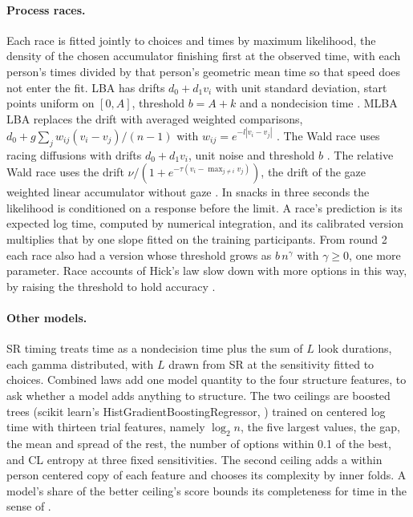 \documentclass[11pt]{article}
\begin{document}
\paragraph{Process races.} Each race is fitted jointly to choices and times by maximum likelihood, the density of the chosen accumulator finishing first at the observed time, with each person's times divided by that person's geometric mean time so that speed does not enter the fit. LBA has drifts $d_0 + d_1 v_i$ with unit standard deviation, start points uniform on $[0, A]$, threshold $b = A + k$ and a nondecision time \citep{brown2008}. MLBA LBA replaces the drift with averaged weighted comparisons, $d_0 + g \sum_{j} w_{ij}(v_i - v_j)/(n-1)$ with $w_{ij} = e^{-l |v_i - v_j|}$ \citep{trueblood2014}. The Wald race uses racing diffusions with drifts $d_0 + d_1 v_i$, unit noise and threshold $b$ \citep{tillman2020}. The relative Wald race uses the drift $\nu / (1 + e^{-\tau (v_i - \max_{j \neq i} v_j)})$, the drift of the gaze weighted linear accumulator without gaze \citep{thomas2019}. In snacks in three seconds the likelihood is conditioned on a response before the limit. A race's prediction is its expected log time, computed by numerical integration, and its calibrated version multiplies that by one slope fitted on the training participants. From round 2 each race also had a version whose threshold grows as $b\, n^{\gamma}$ with $\gamma \geq 0$, one more parameter. Race accounts of Hick's law slow down with more options in this way, by raising the threshold to hold accuracy \citep{usher2002}.

\paragraph{Other models.} SR timing treats time as a nondecision time plus the sum of $L$ look durations, each gamma distributed, with $L$ drawn from SR at the sensitivity fitted to choices. Combined laws add one model quantity to the four structure features, to ask whether a model adds anything to structure. The two ceilings are boosted trees (scikit learn's HistGradientBoostingRegressor, \citealp{pedregosa2011}) trained on centered log time with thirteen trial features, namely $\log_2 n$, the five largest values, the gap, the mean and spread of the rest, the number of options within 0.1 of the best, and CL entropy at three fixed sensitivities. The second ceiling adds a within person centered copy of each feature and chooses its complexity by inner folds. A model's share of the better ceiling's score bounds its completeness for time in the sense of \citet{fudenberg2022}.
\end{document}
